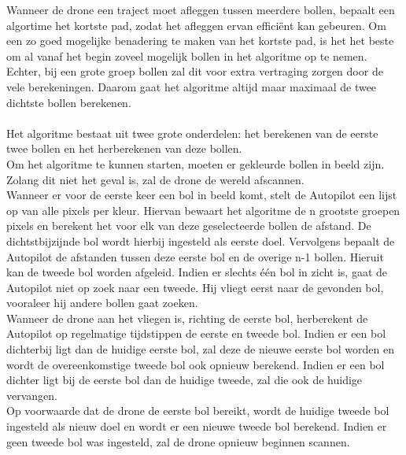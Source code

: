 \noindent
Wanneer de drone een traject moet afleggen tussen meerdere bollen, bepaalt een algortime het kortste pad, zodat het afleggen ervan effici\"ent kan gebeuren. Om een zo goed mogelijke benadering te maken van het kortste pad, is het het beste om al vanaf het begin zoveel mogelijk bollen in het algoritme op te nemen. Echter, bij een grote groep bollen zal dit voor extra vertraging zorgen door de vele berekeningen. Daarom gaat het algoritme altijd maar maximaal de twee dichtste bollen berekenen.
\\
\\
Het algoritme bestaat uit twee grote onderdelen: het berekenen van de eerste twee bollen en het herberekenen van deze bollen.
\\
Om het algoritme te kunnen starten, moeten er gekleurde bollen in beeld zijn. Zolang dit niet het geval is, zal de drone de wereld afscannen.
\\
Wanneer er voor de eerste keer een bol in beeld komt, stelt de Autopilot een lijst op van alle pixels per kleur. Hiervan bewaart het algoritme de n grootste groepen pixels en berekent het voor elk van deze geselecteerde bollen de afstand. De dichtstbijzijnde bol wordt hierbij ingesteld als eerste doel. Vervolgens bepaalt de Autopilot de afstanden tussen deze eerste bol en de overige n-1 bollen. Hieruit kan de tweede bol worden afgeleid. Indien er slechts \'e\'en bol in zicht is, gaat de Autopilot niet op zoek naar een tweede. Hij vliegt eerst naar de gevonden bol, vooraleer hij andere bollen gaat zoeken.
\\
Wanneer de drone aan het vliegen is, richting de eerste bol, herberekent de Autopilot op regelmatige tijdstippen de eerste en tweede bol. Indien er een bol dichterbij ligt dan de huidige eerste bol, zal deze de nieuwe eerste bol worden en wordt de overeenkomstige tweede bol ook opnieuw berekend. Indien er een bol dichter ligt bij de eerste bol dan de huidige tweede, zal die ook de huidige vervangen.
\\
Op voorwaarde dat de drone de eerste bol bereikt, wordt de huidige tweede bol ingesteld als nieuw doel en wordt er een nieuwe tweede bol berekend. Indien er geen tweede bol was ingesteld, zal de drone opnieuw beginnen scannen.